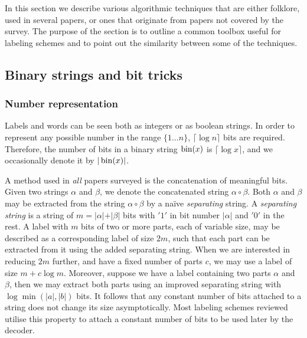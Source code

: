 In this section we describe  various algorithmic techniques that are either folklore, used in several papers,  or ones that  originate from papers not covered by the survey.
The purpose of the  section is to outline  a common toolbox useful for labeling schemes and to point out the similarity between some of the techniques. 

\subsection{Binary strings and bit tricks} \label{section:Misc-Tools}
\subsubsection{Number representation}
Labels  and words can be seen both as integers or as  boolean strings. 
In order to represent any possible number in the range $\{1 \dots n\}$, $\lceil \log n \rceil$ bits are required.
Therefore, the number of bits in  a binary string $\operatorname{bin}(x)$ is $\lceil \log x \rceil$, and we occasionally denote it by $ \vert \operatorname{bin}(x) \vert$. 

A method  used in \emph{all} papers surveyed   is the concatenation of  meaningful bits.
Given two strings $\alpha$ and $\beta$, we denote the concatenated string  $\alpha \circ \beta$.
Both $\alpha$ and $\beta$ may be extracted  from the string $\alpha \circ \beta$  by a na\"ive  \emph{separating} string.
 A \emph{separating string} is a string of $m= \vert \alpha \vert + \vert \beta \vert$ bits with $'1'$ in bit number $\vert \alpha \vert$ and $'0'$ in the rest.
A  label with $m$ bits of two or more parts, each of variable size, may be described as a corresponding label of size $2m$, such that each part can be extracted from it using the added separating string.
When we are interested in reducing $2m$ further, and have a fixed number of parts  $c$, we may use a label of size $m+ c \log m$.
Moreover, suppose we have  a label containing two parts  $\alpha$ and $\beta$, then we may extract both parts using an improved separating string with  $\log \min(\vert a \vert ,\vert b \vert)$  bits.
It follows that any constant number of bits attached to a string does not change its size asymptotically. 
Most labeling schemes reviewed utilise this property to attach a constant number of bits to be   used later by the decoder.

